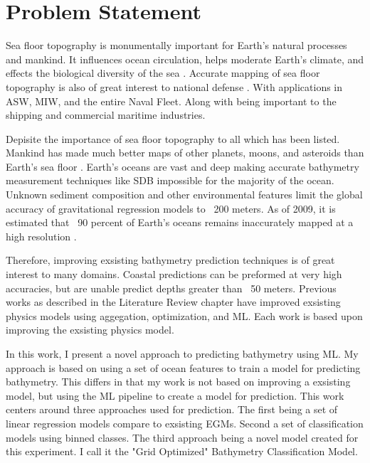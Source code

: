 \section{Problem Statement}
\setlength{\parindent}{10ex}

Sea floor topography is monumentally important for Earth's natural processes and mankind.
It influences ocean circulation, helps moderate Earth's climate, and effects the biological diversity of the sea \cite{kunze2004role}.
Accurate mapping of sea floor topography is also of great interest to national defense \cite{goodman1982defence}.
With applications in \ac{ASW}, \ac{MIW}, and the entire Naval Fleet.
Along with being important to the shipping and commercial maritime industries.

\par
Depisite the importance of sea floor topography to all which has been listed.
Mankind has made much better maps of other planets, moons, and asteroids than Earth's sea floor \cite{becker2009global}.
Earth's oceans are vast and deep making accurate bathymetry measurement techniques like \ac{SDB} impossible for the majority of the ocean.
Unknown sediment composition and other environmental features limit the global accuracy of gravitational regression models to ~200 meters.
As of 2009, it is estimated that ~90 percent of Earth's oceans remains inaccurately mapped at a high resolution \cite{becker2009global}.

\par
Therefore, improving exsisting bathymetry prediction techniques is of great interest to many domains.
Coastal predictions can be preformed at very high accuracies, but are unable predict depths greater than ~50 meters.
Previous works as described in the Literature Review chapter have improved exsisting physics models using aggegation, optimization, and \ac{ML}.
Each work is based upon improving the exsisting physics model.

\par
In this work, I present a novel approach to predicting bathymetry using \ac{ML}.
My approach is based on using a set of ocean features to train a model for predicting bathymetry.
This differs in that my work is not based on improving a exsisting model, but using the \ac{ML} pipeline to create a model for prediction.
This work centers around three approaches used for prediction.
The first being a set of linear regression models compare to exsisting \ac{EGM}s.
Second a set of classification models using binned classes.
The third approach being a novel model created for this experiment.
I call it the "Grid Optimized" Bathymetry Classification Model.